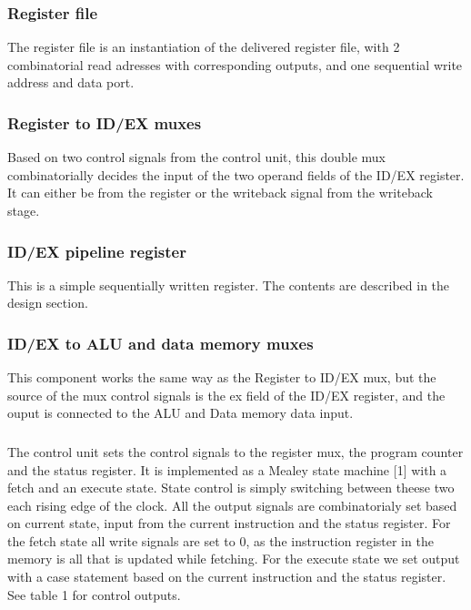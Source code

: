 \documentclass[11pt]{report}
\begin{document}
\subsubsection*{Register file}
The register file is an instantiation of the delivered register file, with 
2 combinatorial read adresses with corresponding outputs, and one sequential
write address and data port.

\subsubsection*{Register to ID/EX muxes}
Based on two control signals from the control unit, this double mux combinatorially
decides the input of the two operand fields of the ID/EX register. It can 
either be from the register or the writeback signal from the writeback stage.
\subsubsection*{ID/EX pipeline register}
This is a simple sequentially written register. The contents are described in the 
design section. %
\subsubsection*{ID/EX to ALU and data memory muxes}
This component works the same way as the Register to ID/EX mux, but the source of the 
mux control signals is the ex field of the ID/EX register, and the ouput is connected
to the ALU and Data memory data input.

\subsubsection*{}


The control unit sets the control signals to the register mux, the program counter 
and the status register. It is implemented as a Mealey state machine [1]
with a fetch and an execute state. State control is simply switching between theese two
each rising edge of the clock. All the output signals are combinatorialy set based on current
state, input from the current instruction and the status register. For the fetch state all
write signals are set to 0, as the instruction register in the memory is all that is updated
while fetching. For the execute state we set output with a case statement based on the current 
instruction and the status register. See table 1 for control outputs.
\end{document}
